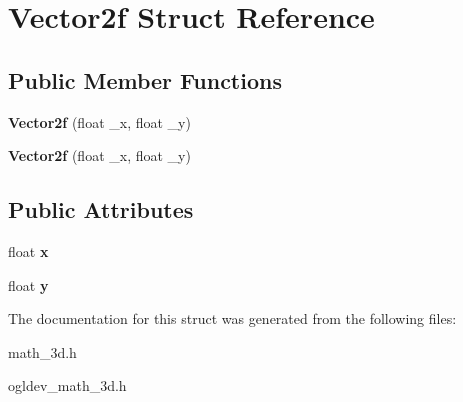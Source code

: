 \hypertarget{structVector2f}{\section{Vector2f Struct Reference}
\label{structVector2f}
}
\subsection*{Public Member Functions}
\begin{DoxyCompactItemize}
\item 
\hypertarget{structVector2f_a4d82d9240b5de271e5e45c16e8de561e}{{\bfseries Vector2f} (float \-\_\-x, float \-\_\-y)}\label{structVector2f_a4d82d9240b5de271e5e45c16e8de561e}

\item 
\hypertarget{structVector2f_a4d82d9240b5de271e5e45c16e8de561e}{{\bfseries Vector2f} (float \-\_\-x, float \-\_\-y)}\label{structVector2f_a4d82d9240b5de271e5e45c16e8de561e}

\end{DoxyCompactItemize}
\subsection*{Public Attributes}
\begin{DoxyCompactItemize}
\item 
\hypertarget{structVector2f_add58d2378e3a3abdb76cf0ac51c9acfc}{float {\bfseries x}}\label{structVector2f_add58d2378e3a3abdb76cf0ac51c9acfc}

\item 
\hypertarget{structVector2f_a14874a72597fd358b15f8ba34b999c4d}{float {\bfseries y}}\label{structVector2f_a14874a72597fd358b15f8ba34b999c4d}

\end{DoxyCompactItemize}


The documentation for this struct was generated from the following files\-:\begin{DoxyCompactItemize}
\item 
math\-\_\-3d.\-h\item 
ogldev\-\_\-math\-\_\-3d.\-h\end{DoxyCompactItemize}
